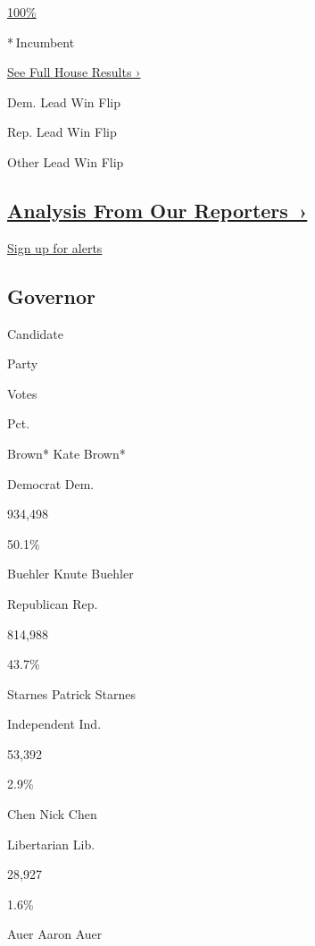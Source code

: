 \href{https://www.nytimes3xbfgragh.onion/elections/results/oregon-house-district-5}{100\%}

\href{https://www.nytimes3xbfgragh.onion/elections/results/oregon-house-district-5}{}

* Incumbent~

\href{https://www.nytimes3xbfgragh.onion/interactive/2018/11/06/us/elections/results-house-elections.html}{See
Full House Results ›}

Dem. Lead Win Flip

Rep. Lead Win Flip

Other Lead Win Flip

\hypertarget{analysis-from-our-reporters-}{%
\subsection{\texorpdfstring{\href{https://www.nytimes3xbfgragh.onion/interactive/2018/11/06/us/elections/live-midterm-election-analysis-updates.html}{Analysis
From Our
Reporters~›}}{Analysis From Our Reporters~›}}\label{analysis-from-our-reporters-}}

\protect\hyperlink{}{Sign up for alerts}

\hypertarget{governor}{%
\subsection{Governor}\label{governor}}

Candidate

Party

Votes

Pct.

 Brown* Kate Brown*

Democrat Dem.

934,498

50.1\%

 Buehler Knute Buehler

Republican Rep.

814,988

43.7\%

 Starnes Patrick Starnes

Independent Ind.

53,392

2.9\%

 Chen Nick Chen

Libertarian Lib.

28,927

1.6\%

 Auer Aaron Auer


